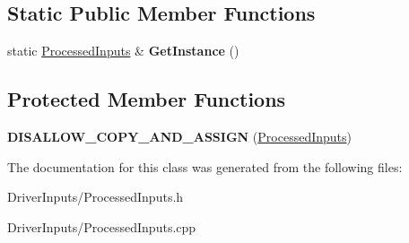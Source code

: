 \subsection*{\-Static \-Public \-Member \-Functions}
\begin{DoxyCompactItemize}
\item 
\hypertarget{class_processed_inputs_a0cc1683c0796dba59a271d03e852c014}{
static \hyperlink{class_processed_inputs}{\-Processed\-Inputs} \& {\bfseries \-Get\-Instance} ()}
\label{class_processed_inputs_a0cc1683c0796dba59a271d03e852c014}

\end{DoxyCompactItemize}
\subsection*{\-Protected \-Member \-Functions}
\begin{DoxyCompactItemize}
\item 
\hypertarget{class_processed_inputs_aa122ff93a0926ff2820c62f68e8ecd05}{
{\bfseries \-D\-I\-S\-A\-L\-L\-O\-W\-\_\-\-C\-O\-P\-Y\-\_\-\-A\-N\-D\-\_\-\-A\-S\-S\-I\-G\-N} (\hyperlink{class_processed_inputs}{\-Processed\-Inputs})}
\label{class_processed_inputs_aa122ff93a0926ff2820c62f68e8ecd05}

\end{DoxyCompactItemize}


\-The documentation for this class was generated from the following files\-:\begin{DoxyCompactItemize}
\item 
\-Driver\-Inputs/\-Processed\-Inputs.\-h\item 
\-Driver\-Inputs/\-Processed\-Inputs.\-cpp\end{DoxyCompactItemize}
